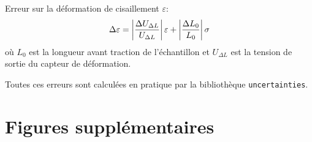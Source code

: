 Erreur sur la déformation de cisaillement \(\varepsilon\):
\begin{equation}
    \Delta \varepsilon = \left|\frac{\Delta U_{\Delta L}}{U_{\Delta L}}\right| \varepsilon + \left|\frac{\Delta L_0}{L_0}\right| \sigma
\end{equation}
où \(L_0\) est la longueur avant traction de l'échantillon et \(U_{\Delta L}\) est la tension de sortie du capteur de déformation.

Toutes ces erreurs sont calculées en pratique par la bibliothèque \texttt{uncertainties}.


\section{Figures supplémentaires}
\label{sec:fig_supp}